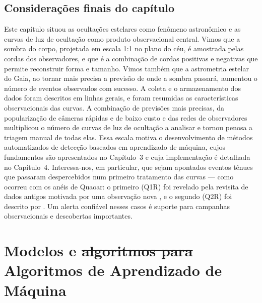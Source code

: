 \documentclass[msc]{on} %
\makeatletter
\providecommand{\DIFaddtex}[1]{{\protect\color{red}#1}} %
\providecommand{\DIFdeltex}[1]{{\protect\color{red}\sout{#1}}} %
\providecommand{\DIFaddbegin}{} %
\providecommand{\DIFaddend}{} %
\providecommand{\DIFdelbegin}{} %
\providecommand{\DIFdelend}{} %
\providecommand{\DIFadd}[1]{\texorpdfstring{\DIFaddtex{#1}}{#1}} %
\providecommand{\DIFdel}[1]{\texorpdfstring{\DIFdeltex{#1}}{}} %
\let\sout@orig\sout %
\renewcommand{\sout}[1]{\ifmmode\text{\sout@orig{\ensuremath{#1}}}\else\sout@orig{#1}\fi} %
\makeatother
\begin{document}
\section{Considerações finais do capítulo}
\label{sec:consideracoes_cap2}

Este capítulo situou as ocultações estelares como fenômeno astronômico e as curvas de luz de ocultação como produto observacional central. Vimos que a sombra do corpo, projetada em escala 1:1 no plano do céu, é amostrada pelas cordas dos observadores, e que é a combinação de cordas positivas e negativas que permite reconstruir forma e tamanho. Vimos também que a astrometria estelar do Gaia, ao tornar mais precisa a previsão de onde a sombra passará, aumentou o número de eventos observados com sucesso. A coleta e o armazenamento dos dados foram descritos em linhas gerais, e foram resumidas as características observacionais das curvas. A combinação de previsões mais precisas, da popularização de câmeras rápidas e de baixo custo e das redes de observadores multiplicou o número de curvas de luz de ocultação a analisar e tornou penosa a triagem manual de todas elas. Essa escala motiva o desenvolvimento de métodos automatizados de detecção baseados em aprendizado de máquina, cujos fundamentos são apresentados no Capítulo~3 e cuja implementação é detalhada no Capítulo~4. Interessa-nos, em particular, que sejam apontados eventos tênues que passaram despercebidos num primeiro tratamento das curvas --- como ocorreu com os anéis de Quaoar: o primeiro (Q1R) foi revelado pela revisita de dados antigos motivada por uma observação nova \citep{Morgado2023}, e o segundo (Q2R) foi descrito por \citet{Quaoar2023}. Um alerta confiável nesses casos é suporte para campanhas observacionais e descobertas importantes.


\chapter{Modelos e \DIFdelbegin \DIFdel{algoritmos para }%
\DIFdelend\ifhmode\hskip0pt\fi \DIFaddbegin \DIFadd{Algoritmos de Aprendizado de Máquina}\DIFaddend }

\end{document}
